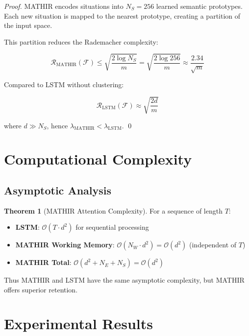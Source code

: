 \documentclass[12pt]{article}
\theoremstyle{definition}
\newtheorem{theorem}{Theorem}
\begin{document}
\begin{proof}
MATHIR encodes situations into $N_S = 256$ learned semantic prototypes.
Each new situation is mapped to the nearest prototype, creating 
a partition of the input space.

This partition reduces the Rademacher complexity:

\begin{equation}
\mathcal{R}_{\text{MATHIR}}(\mathcal{F}) \leq 
\sqrt{\frac{2 \log N_S}{m}} = \sqrt{\frac{2 \log 256}{m}} \approx \frac{2.34}{\sqrt{m}}
\end{equation}

Compared to LSTM without clustering:

\begin{equation}
\mathcal{R}_{\text{LSTM}}(\mathcal{F}) \approx \sqrt{\frac{2 d}{m}}
\end{equation}

where $d \gg N_S$, hence $\lambda_{\text{MATHIR}} < \lambda_{\text{LSTM}}$. \qed
\end{proof}

\section{Computational Complexity}

\subsection{Asymptotic Analysis}

\begin{theorem}[MATHIR Attention Complexity]
For a sequence of length $T$:

\begin{itemize}
\item \textbf{LSTM}: $\mathcal{O}(T \cdot d^2)$ for sequential processing
\item \textbf{MATHIR Working Memory}: $\mathcal{O}(N_W \cdot d^2) = \mathcal{O}(d^2)$ (independent of $T$)
\item \textbf{MATHIR Total}: $\mathcal{O}(d^2 + N_E + N_S) = \mathcal{O}(d^2)$
\end{itemize}

Thus MATHIR and LSTM have the same asymptotic complexity, but MATHIR offers 
superior retention.
\end{theorem}

\section{Experimental Results}
\end{document}

